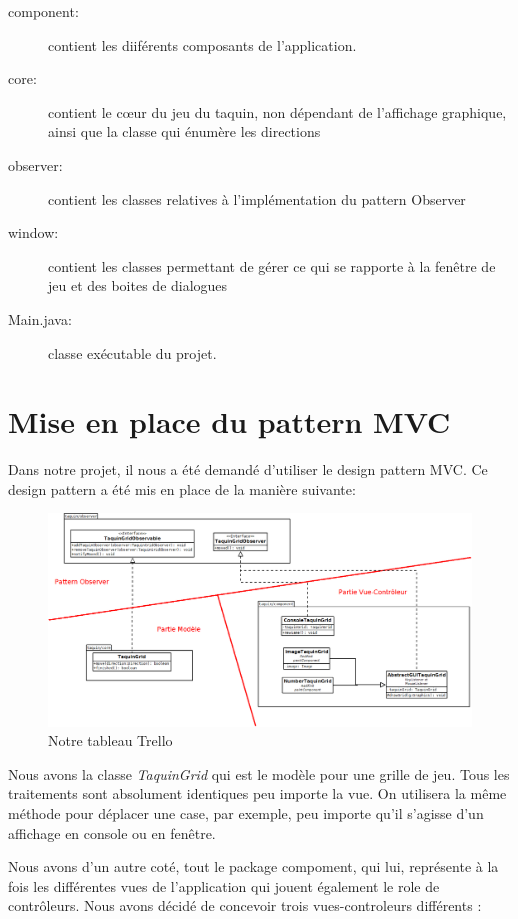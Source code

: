 		\begin{description}
			\item [component:] contient les diiférents composants de l’application.
			\item [core:] contient le cœur du jeu du taquin, non dépendant de l'affichage graphique, ainsi que la classe qui énumère les directions
			\item [observer:] contient les classes relatives à l'implémentation du pattern Observer
			\item [window:] contient les classes permettant de gérer ce qui se rapporte à la fenêtre de jeu et des boites de dialogues
			\item [Main.java:] classe exécutable du projet.
		\end{description}

	\section{Mise en place du pattern MVC}

	Dans notre projet, il nous a été demandé d'utiliser le design pattern MVC. Ce design pattern a été mis en place de la manière suivante:

	\begin{figure}[H]
		\centering\includegraphics[width=1\textwidth, keepaspectratio]{img/diagramMVC.png}
		\caption{Notre tableau Trello}
		\label{Mise en place du M-VC}
	\end{figure}

	Nous avons la classe \textit{TaquinGrid} qui est le modèle pour une grille de jeu. Tous les traitements sont absolument identiques peu importe la vue. On utilisera la même méthode pour déplacer une case, par exemple, peu importe qu'il s'agisse d'un affichage en console ou en fenêtre.

	Nous avons d'un autre coté, tout le package compoment, qui lui, représente à la fois les différentes vues de l'application qui jouent également le role de contrôleurs. Nous avons décidé de concevoir trois vues-controleurs différents :

